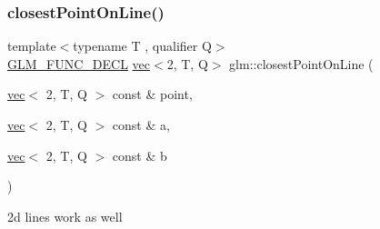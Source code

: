 \subsubsection{\texorpdfstring{closest\+Point\+On\+Line()}{closestPointOnLine()}\hspace{0.1cm}{\footnotesize\ttfamily [2/2]}}
{\footnotesize\ttfamily template$<$typename T , qualifier Q$>$ \\
\mbox{\hyperlink{setup_8hpp_ab2d052de21a70539923e9bcbf6e83a51}{G\+L\+M\+\_\+\+F\+U\+N\+C\+\_\+\+D\+E\+CL}} \mbox{\hyperlink{structglm_1_1vec}{vec}}$<$2, T, Q$>$ glm\+::closest\+Point\+On\+Line (\begin{DoxyParamCaption}\item[{\mbox{\hyperlink{structglm_1_1vec}{vec}}$<$ 2, T, Q $>$ const \&}]{point,  }\item[{\mbox{\hyperlink{structglm_1_1vec}{vec}}$<$ 2, T, Q $>$ const \&}]{a,  }\item[{\mbox{\hyperlink{structglm_1_1vec}{vec}}$<$ 2, T, Q $>$ const \&}]{b }\end{DoxyParamCaption})}



2d lines work as well 

